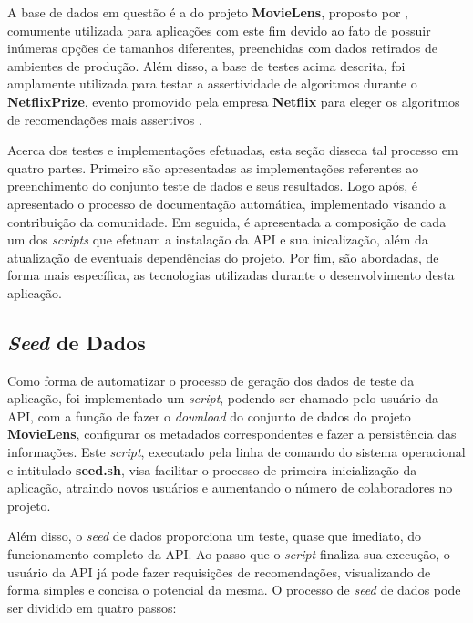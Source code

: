 \documentclass[12pt, openright, oneside, a4paper, brazil]{abntex2}
\begin{document}
A base de dados em questão é a do projeto \textbf{MovieLens}, proposto por , comumente utilizada para aplicações com este fim devido ao fato de possuir inúmeras opções de tamanhos diferentes, preenchidas com dados retirados de ambientes de produção. Além disso, a base de testes acima descrita, foi amplamente utilizada para testar a assertividade de algoritmos durante o \textbf{NetflixPrize}, evento promovido pela empresa \textbf{Netflix} para eleger os algoritmos de recomendações mais assertivos \cite{bennett2007netflix}.

Acerca dos testes e implementações efetuadas, esta seção disseca tal processo em quatro partes. Primeiro são apresentadas as implementações referentes ao preenchimento do conjunto teste de dados e seus resultados. Logo após, é apresentado o processo de documentação automática, implementado visando a contribuição da comunidade. Em seguida, é apresentada a composição de cada um dos \textit{scripts} que efetuam a instalação da API e sua inicalização, além da atualização de eventuais dependências do projeto. Por fim, são abordadas, de forma mais específica, as tecnologias utilizadas durante o desenvolvimento desta aplicação.

\subsection{\textit{Seed} de Dados} \label{seed}

Como forma de automatizar o processo de geração dos dados de teste da aplicação, foi implementado um \textit{script}, podendo ser chamado pelo usuário da API, com a função de fazer o \textit{download} do conjunto de dados do projeto \textbf{MovieLens}, configurar os metadados correspondentes e fazer a persistência das informações. Este \textit{script}, executado pela linha de comando do sistema operacional e intitulado \textbf{seed.sh}, visa facilitar o processo de primeira inicialização da aplicação, atraindo novos usuários e aumentando o número de colaboradores no projeto.

Além disso, o \textit{seed} de dados proporciona um teste, quase que imediato, do funcionamento completo da API. Ao passo que o \textit{script} finaliza sua execução, o usuário da API já pode fazer requisições de recomendações, visualizando de forma simples e concisa o potencial da mesma. O processo de \textit{seed} de dados pode ser dividido em quatro passos:
\end{document}
